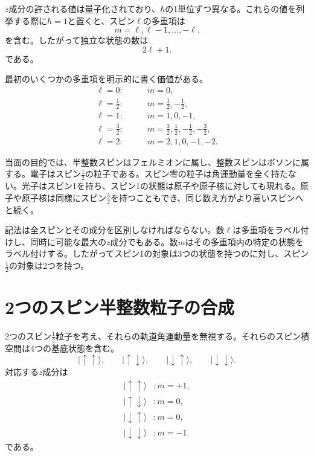 \(z\)成分の許される値は量子化されており、\(\hbar\)の1単位ずつ異なる。これらの値を列挙する際に\(\hbar=1\)と置くと、スピン\(\ell\)の多重項は
\begin{equation}
m=\ell,\ell-1,\ldots,-\ell.
\end{equation}
を含む。したがって独立な状態の数は
\begin{equation}
2\ell+1.
\end{equation}
である。

最初のいくつかの多重項を明示的に書く価値がある。
\begin{align}
\ell=0:&\qquad m=0,\\
\ell=\frac12:&\qquad m=\frac12,-\frac12,\\
\ell=1:&\qquad m=1,0,-1,\\
\ell=\frac32:&\qquad
m=\frac32,\frac12,-\frac12,-\frac32,\\
\ell=2:&\qquad m=2,1,0,-1,-2.
\end{align}

当面の目的では、半整数スピンはフェルミオンに属し、整数スピンはボソンに属する。電子はスピン\(\tfrac12\)の粒子である。スピン零の粒子は角運動量を全く持たない。光子はスピン1を持ち、スピン1の状態は原子や原子核に対しても現れる。原子や原子核は同様にスピン\(\tfrac32\)を持つこともでき、同じ数え方がより高いスピンへと続く。

記法は全スピンとその成分を区別しなければならない。数\(\ell\)は多重項をラベル付けし、同時に可能な最大の\(z\)成分でもある。数\(m\)はその多重項内の特定の状態をラベル付けする。したがってスピン1の対象は3つの状態を持つのに対し、スピン\(\tfrac12\)の対象は2つを持つ。

\section{2つのスピン半整数粒子の合成}

2つのスピン\(\tfrac12\)粒子を考え、それらの軌道角運動量を無視する。それらのスピン積空間は4つの基底状態を含む。
\begin{equation}
|\uparrow\uparrow\rangle,\qquad
|\uparrow\downarrow\rangle,\qquad
|\downarrow\uparrow\rangle,\qquad
|\downarrow\downarrow\rangle.
\end{equation}
対応する\(z\)成分は
\begin{align}
|\uparrow\uparrow\rangle &: m=+1,\\
|\uparrow\downarrow\rangle &: m=0,\\
|\downarrow\uparrow\rangle &: m=0,\\
|\downarrow\downarrow\rangle &: m=-1.
\end{align}
である。

